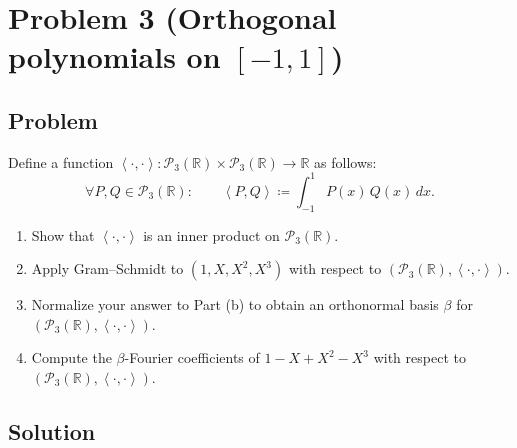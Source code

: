 \documentclass[12pt]{article}
\newcommand{\df}{\coloneqq}
\newcommand{\R}{\mathbb{R}}
\newcommand{\cP}{\mathcal{P}}
\newcommand{\ip}[2]{\left\langle #1,#2\right\rangle}
\begin{document}
\newpage
\section{Problem 3 (Orthogonal polynomials on $[-1,1]$)}
\subsection{Problem}
Define a function $\ip{\cdot}{\cdot}:\cP_3(\R)\times \cP_3(\R)\to \R$ as follows:
\[
\forall P,Q\in\cP_3(\R):\qquad
\ip{P}{Q}\df \int_{-1}^{1} P(x)\,Q(x)\,dx.
\]
\begin{enumerate}[label=(\alph*)]
\item Show that $\ip{\cdot}{\cdot}$ is an inner product on $\cP_3(\R)$.
\item Apply Gram--Schmidt to $(1,X,X^2,X^3)$ with respect to $(\cP_3(\R),\ip{\cdot}{\cdot})$.
\item Normalize your answer to Part (b) to obtain an orthonormal basis $\beta$ for $(\cP_3(\R),\ip{\cdot}{\cdot})$.
\item Compute the $\beta$-Fourier coefficients of $1-X+X^2-X^3$ with respect to $(\cP_3(\R),\ip{\cdot}{\cdot})$.
\end{enumerate}

\subsection{Solution}
\end{document}
